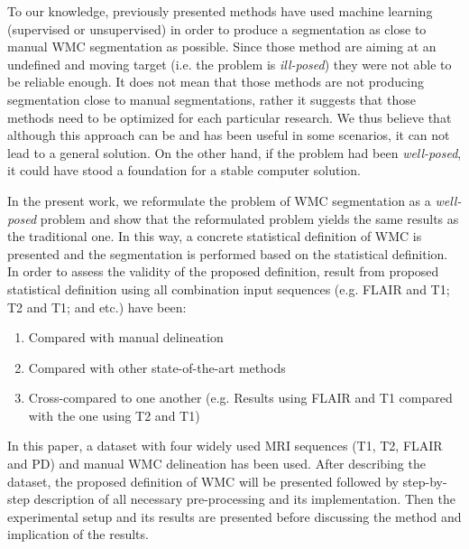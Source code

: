 To our knowledge, previously presented methods have used machine learning (supervised or unsupervised) in order to produce a segmentation as close to manual WMC segmentation as possible. Since those method are aiming at an undefined and moving target (i.e. the problem is \textit{ill-posed}) they were not able to be reliable enough. It does not mean that those methods are not producing segmentation close to manual segmentations, rather it suggests that those methods need to be optimized for each particular research. We thus believe that although this approach can be and has been useful in some scenarios, it can not lead to a general solution. On the other hand, if the problem had been \textit{well-posed}, it could have stood a foundation for a stable computer solution.

In the present work, we reformulate the problem of WMC segmentation as a \textit{well-posed} problem and show that the reformulated problem yields the same results as the traditional one. In this way, a concrete statistical definition of WMC is presented and the segmentation is performed based on the statistical definition. In order to assess the validity of the proposed definition, result from proposed statistical definition using all combination input sequences (e.g. FLAIR and T1; T2 and T1; and etc.) have been:

\begin{enumerate}
\item Compared with manual delineation
\item Compared with other state-of-the-art methods
\item Cross-compared to one another (e.g. Results using FLAIR and T1 compared with the one using T2 and T1)
\end{enumerate}

In this paper, a dataset with four widely used MRI sequences (T1, T2, FLAIR and PD) and manual WMC delineation has been used. After describing the dataset, the proposed definition of WMC will be presented followed by step-by-step description of all necessary pre-processing and its implementation. Then the experimental setup and its results are presented before discussing the method and implication of the results.

  
  
  
  
  
  
  
  
  
  
  
  
  
  
  